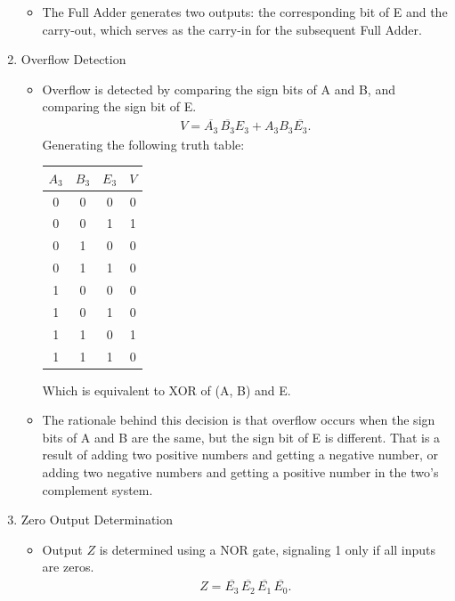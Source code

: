 \documentclass{article}
\begin{document}
\begin{enumerate}
\begin{itemize}
      \item The Full Adder generates two outputs: the corresponding bit of E
        and the carry-out, which serves as the carry-in for the subsequent Full
        Adder. 
    \end{itemize}
  \item Overflow Detection
    \begin{itemize}
      \item Overflow is detected by comparing the sign bits of A and B, and
        comparing the sign bit of E.
        \begin{align*}
          V = \overline{A_{3}}\,\overline{B_{3}} E_{3} + A_{3}B_{3}\overline{E_{3}}
        .\end{align*}
        Generating the following truth table:
        \begin{table}[H]
          \begin{center}
            \begin{tabular}{c|c|c|c}
              \hline
              $A_{3}$ & $B_{3}$ & $E_{3}$ & $V$ \\
              \hline
              0 & 0 & 0 & 0 \\
              0 & 0 & 1 & 1 \\
              0 & 1 & 0 & 0 \\
              0 & 1 & 1 & 0 \\
              1 & 0 & 0 & 0 \\
              1 & 0 & 1 & 0 \\
              1 & 1 & 0 & 1 \\
              1 & 1 & 1 & 0 \\
              \hline
            \end{tabular}
          \end{center}
        \end{table}
        Which is equivalent to XOR of (A, B) and E.
      \item The rationale behind this decision is that overflow occurs when the
        sign bits of A and B are the same, but the sign bit of E is different.
        That is a result of adding two positive numbers and getting a negative
        number, or adding two negative numbers and getting a positive number in
        the two’s complement system.
    \end{itemize}
  \item Zero Output Determination
    \begin{itemize}
      \item Output $Z$ is determined using a NOR gate, signaling 1 only if all
        inputs are zeros. 
        \begin{align*}
          Z =
          \overline{E_{3}}\,\overline{E_{2}}\,\overline{E_{1}}\,\overline{E_{0}}
        .\end{align*}
    \end{itemize}
\end{enumerate}
\end{document}
